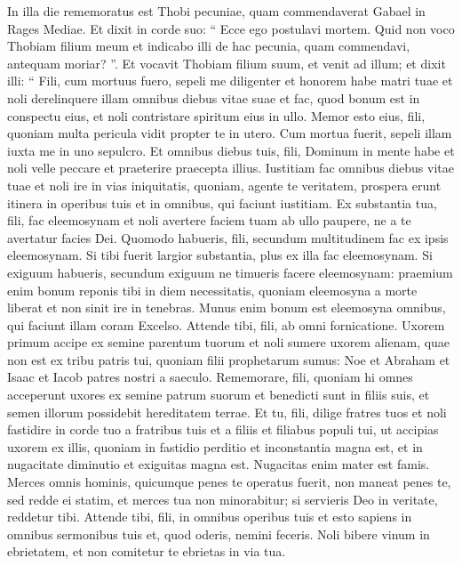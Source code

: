 \begin{biblechapter}
\begin{biblechapter}
\begin{biblechapter}
\begin{biblechapter}
\verse In illa die rememoratus est Thobi pecuniae, quam commendaverat Gabael in Rages Mediae. 
\verse Et dixit in corde suo: “ Ecce ego postulavi mortem. Quid non voco Thobiam filium meum et indicabo illi de hac pecunia, quam commendavi, antequam moriar? ”. 
\verse Et vocavit Thobiam filium suum, et venit ad illum; et dixit illi: “ Fili, cum mortuus fuero, sepeli me diligenter et honorem habe matri tuae et noli derelinquere illam omnibus diebus vitae suae et fac, quod bonum est in conspectu eius, et noli contristare spiritum eius in ullo. 
\verse Memor esto eius, fili, quoniam multa pericula vidit propter te in utero. Cum mortua fuerit, sepeli illam iuxta me in uno sepulcro. 
\verse Et omnibus diebus tuis, fili, Dominum in mente habe et noli velle peccare et praeterire praecepta illius. Iustitiam fac omnibus diebus vitae tuae et noli ire in vias iniquitatis, 
 \verse quoniam, agente te veritatem, prospera erunt itinera in operibus tuis et in omnibus, qui faciunt iustitiam. 
\verse Ex substantia tua, fili, fac eleemosynam et noli avertere faciem tuam ab ullo paupere, ne a te avertatur facies Dei. 
 \verse Quomodo habueris, fili, secundum multitudinem fac ex ipsis eleemosynam. Si tibi fuerit largior substantia, plus ex illa fac eleemosynam. Si exiguum habueris, secundum exiguum ne timueris facere eleemosynam: 
\verse praemium enim bonum reponis tibi in diem necessitatis, 
\verse quoniam eleemosyna a morte liberat et non sinit ire in tenebras. 
\verse Munus enim bonum est eleemosyna omnibus, qui faciunt illam coram Excelso. 
\verse Attende tibi, fili, ab omni fornicatione. Uxorem primum accipe ex semine parentum tuorum et noli sumere uxorem alienam, quae non est ex tribu patris tui, quoniam filii prophetarum sumus: Noe et Abraham et Isaac et Iacob patres nostri a saeculo. Rememorare, fili, quoniam hi omnes acceperunt uxores ex semine patrum suorum et benedicti sunt in filiis suis, et semen illorum possidebit hereditatem terrae.
 \verse Et tu, fili, dilige fratres tuos et noli fastidire in corde tuo a fratribus tuis et a filiis et filiabus populi tui, ut accipias uxorem ex illis, quoniam in fastidio perditio et inconstantia magna est, et in nugacitate diminutio et exiguitas magna est. Nugacitas enim mater est famis. 
\verse Merces omnis hominis, quicumque penes te operatus fuerit, non maneat penes te, sed redde ei statim, et merces tua non minorabitur; si servieris Deo in veritate, reddetur tibi. Attende tibi, fili, in omnibus operibus tuis et esto sapiens in omnibus sermonibus tuis 
\verse et, quod oderis, nemini feceris. Noli bibere vinum in ebrietatem, et non comitetur te ebrietas in via tua. 

\end{biblechapter}
\end{biblechapter}
\end{biblechapter}
\end{biblechapter}
